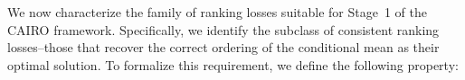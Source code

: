 \documentclass[11pt]{article}
\theoremstyle{plain}
\theoremstyle{plain}
\theoremstyle{plain}
\theoremstyle{plain}
\theoremstyle{plain}
\theoremstyle{plain}
\theoremstyle{plain}
\begin{document}




We now characterize the family of ranking losses suitable for Stage~1 of the \textsc{CAIRO} framework. Specifically, we identify the subclass of consistent ranking losses--those that recover the correct ordering of the conditional mean as their optimal solution. To formalize this requirement, we define the following property:
\end{document}
